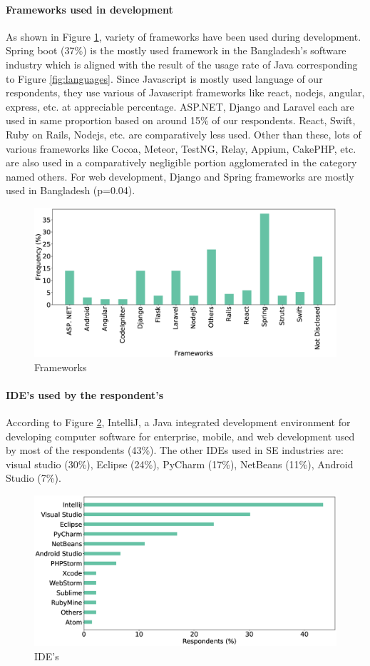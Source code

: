 \paragraph{Frameworks used in development}
As shown in Figure \ref{fig:frameworks}, variety of frameworks have been used during development. Spring boot (37\%) is the mostly used framework in the Bangladesh's software industry which is aligned with the result of the usage rate of Java corresponding to Figure \ref{fig:languages}. Since Javascript is mostly used language of our respondents, they use various of Javascript frameworks like react, nodejs, angular, express, etc. at appreciable percentage. ASP.NET, Django and Laravel each are used in same proportion based on around 15\% of our respondents. React, Swift, Ruby on Rails, Nodejs, etc. are comparatively less used. Other than these, lots of various frameworks like Cocoa, Meteor, TestNG, Relay, Appium, CakePHP, etc. are also used in a comparatively negligible portion agglomerated in the category named others. For web development, Django and Spring frameworks are mostly used in Bangladesh (p=0.04).

\begin{figure}[h]
\centering
  \includegraphics[scale=0.18]{Figures/Respondents_frameworks}
  \caption{Frameworks}
  \label{fig:frameworks}
\end{figure}


\paragraph{IDE's used by the respondent's}
According to Figure \ref{fig:IDEs}, IntelliJ, a Java integrated development environment for developing computer software for enterprise, mobile, and web development used by most of the respondents (43\%). The other IDEs used in SE industries are: visual studio (30\%), Eclipse (24\%), PyCharm (17\%), NetBeans (11\%), Android Studio (7\%).

\begin{figure}[htbp]
\centering
  \includegraphics[scale=0.18]{Figures/Respondents_IDEs}
  \caption{IDE's}
  \label{fig:IDEs}
\end{figure}
